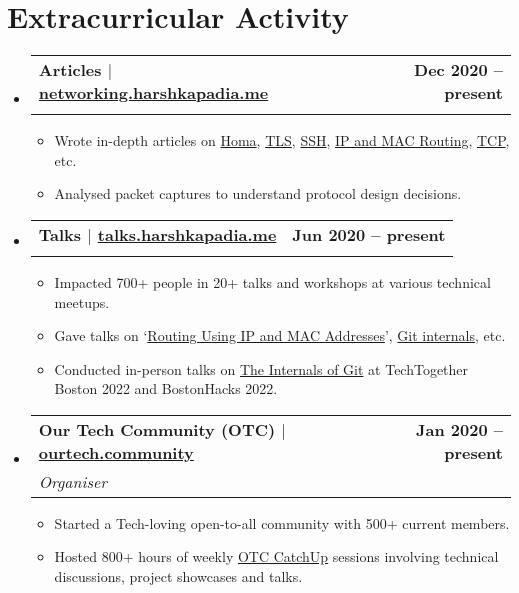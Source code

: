 \documentclass[letterpaper,11pt]{article}
\makeatletter
\newcommand{\resumeItem}[1]{
  \item\small{
    {#1 \vspace{-2pt}}
  }
}
\newcommand{\resumeSubheading}[4]{
  \vspace{-2pt}\item
    \begin{tabular*}{1.0\textwidth}[t]{l@{\extracolsep{\fill}}r}
      \vspace{-2pt}\textbf{#1} & \textbf{\small #2} \\
      \textit{\small#3} & \textit{\small #4} \\
    \end{tabular*}\vspace{-7pt}
}
\newcommand{\resumeSubHeadingListStart}{\begin{itemize}[leftmargin=0.0in, label={}]}
\newcommand{\resumeSubHeadingListEnd}{\end{itemize}}
\newcommand{\resumeItemListStart}{\begin{itemize}}
\newcommand{\resumeItemListEnd}{\end{itemize}\vspace{-5pt}}
\makeatother
\begin{document}
\section{Extracurricular Activity}
    \resumeSubHeadingListStart
        \resumeSubheading
            {\textbf{\normalsize{Articles}} $|$ {\normalfont \href{https://networking.harshkapadia.me}{networking.harshkapadia.me}}}{Dec 2020 -- present}
            {}{}
            \vspace{-15pt}
            \resumeItemListStart
                \resumeItem{Wrote in-depth articles on \href{https://networking.harshkapadia.me/homa}{Homa}, \href{https://networking.harshkapadia.me/tls}{TLS}, \href{https://networking.harshkapadia.me/ssh}{SSH}, \href{https://talks.harshkapadia.me/mac-and-ip-routing/content}{IP and MAC Routing}, \href{https://networking.harshkapadia.me/tcp}{TCP}, etc.}
                \resumeItem{Analysed packet captures to understand protocol design decisions.}
            \resumeItemListEnd

        \resumeSubheading
            {\textbf{\normalsize{Talks}} $|$ {\normalfont \href{https://talks.harshkapadia.me}{talks.harshkapadia.me}}}{Jun 2020 -- present}
            {}{}
            \vspace{-15pt}
            \resumeItemListStart
                \resumeItem{Impacted 700+ people in 20+ talks and workshops at various technical meetups.}
                \resumeItem{Gave talks on `\href{https://talks.harshkapadia.me/mac-and-ip-routing/content}{Routing Using IP and MAC Addresses}', \href{https://talks.harshkapadia.me/git_internals}{Git internals}, etc.}
                \resumeItem{Conducted in-person talks on \href{https://talks.harshkapadia.me/git_internals}{The Internals of Git} at TechTogether Boston 2022 and BostonHacks 2022.}
            \resumeItemListEnd

        \resumeSubheading
            {\textbf{\normalsize{Our Tech Community (OTC)}} $|$ {\normalfont \href{https://ourtech.community}{ourtech.community}}}{Jan 2020 -- present}
            {Organiser}{}
            \resumeItemListStart
                \resumeItem{Started a Tech-loving open-to-all community with 500+ current members.}
                \resumeItem{Hosted 800+ hours of weekly \href{https://catchup.ourtech.community}{OTC CatchUp} sessions involving technical discussions, project showcases and talks.}
            \resumeItemListEnd
    \resumeSubHeadingListEnd
\end{document}
